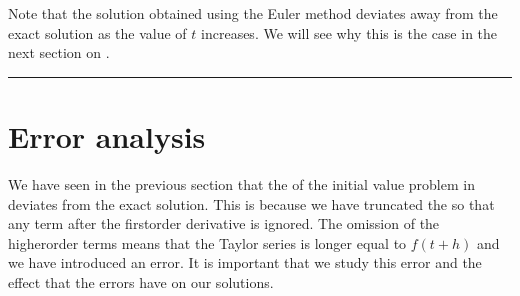 \documentclass[letterpaper,10pt,english]{jupyterBook}
\begin{document}
\sphinxAtStartPar
Note that the solution obtained using the Euler method deviates away from the exact solution as the value of \(t\) increases. We will see why this is the case in the next section on {\hyperref[\detokenize{1_IVPs/1.3_Error_Analysis:error-analysis-section}]{}}.


\bigskip\hrule\bigskip


\sphinxstepscope


\section{Error analysis}
\label{\detokenize{1_IVPs/1.3_Error_Analysis:error-analysis}}\label{\detokenize{1_IVPs/1.3_Error_Analysis:error-analysis-section}}\label{\detokenize{1_IVPs/1.3_Error_Analysis::doc}}
\sphinxAtStartPar
We have seen in the previous section that the {\hyperref[\detokenize{1_IVPs/1.2_Euler_Method:euler-figure}]{}} of the initial value problem  in {\hyperref[\detokenize{1_IVPs/1.2_Euler_Method:euler-example}]{}} deviates from the exact solution. This is because we have truncated the {\hyperref[\detokenize{1_IVPs/1.1_Taylor_Series:taylor-series-definition}]{}} so that any term after the first\sphinxhyphen{}order derivative is ignored. The omission of the higher\sphinxhyphen{}order terms means that the Taylor series is longer equal to \(f(t+h)\) and we have introduced an error. It is important that we study this error and the effect that the errors have on our solutions.
\end{document}
